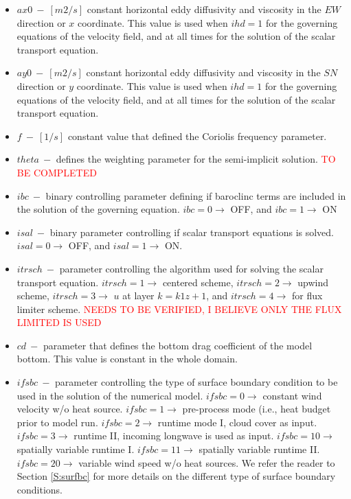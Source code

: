 \begin{itemize}
    \item $ax0\ -\ [m2/s]$ constant horizontal eddy diffusivity and viscosity in the $EW$ direction or $x$ coordinate. This value is used when $ihd = 1$ for the governing equations of the velocity field, and at all times for the solution of the scalar transport equation.
    \item $ay0\ -\ [m2/s]$ constant horizontal eddy diffusivity and viscosity in the $SN$ direction or $y$ coordinate. This value is used when $ihd = 1$ for the governing equations of the velocity field, and at all times for the solution of the scalar transport equation.
    \item $f \ -\ [1/s]$ constant value that defined the Coriolis frequency parameter.
    \item $ theta\ -$ defines the weighting parameter for the semi-implicit solution. \textcolor{red}{TO BE COMPLETED}
    \item $ibc\ -$ binary controlling parameter defining if baroclinc terms are included in the solution of the governing equation. $ibc = 0 \rightarrow$ OFF, and $ibc = 1 \rightarrow$ ON
    \item $isal\ -$ binary parameter controlling if scalar transport equations is solved. $isal = 0 \rightarrow$ OFF, and $isal = 1 \rightarrow$ ON.
    \item $itrsch\ -$ parameter controlling the algorithm used for solving the scalar transport equation. $itrsch = 1 \rightarrow$ centered scheme, $itrsch = 2 \rightarrow$ upwind scheme, $itrsch = 3 \rightarrow$ $u$ at layer $k = k1z + 1$, and $itrsch = 4 \rightarrow$ for flux limiter scheme. \textcolor{red}{NEEDS TO BE VERIFIED, I BELIEVE ONLY THE FLUX LIMITED IS USED}
    \item $cd\ -$ parameter that defines the bottom drag coefficient of the model bottom. This value is constant in the whole domain.
    \item $ifsbc\ -$ parameter controlling the type of surface boundary condition to be used in the solution of the numerical model. $ifsbc = 0 \rightarrow$ constant wind velocity w/o heat source. $ifsbc = 1 \rightarrow$ pre-process mode (i.e., heat budget prior to model run. $ifsbc = 2 \rightarrow$ runtime mode I, cloud cover as input. $ifsbc = 3 \rightarrow$ runtime II, incoming longwave is used as input. $ifsbc = 10 \rightarrow$ spatially variable runtime I. $ifsbc = 11 \rightarrow$ spatially variable runtime II. $ifsbc = 20 \rightarrow$ variable wind speed w/o heat sources. We refer the reader to Section \ref{S:surfbc} for more details on the different type of surface boundary conditions.

\end{itemize}
